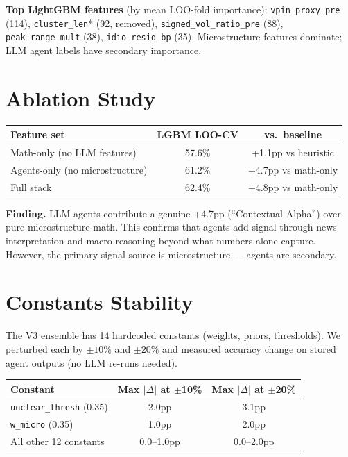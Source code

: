 \documentclass[11pt, a4paper]{article}
\begin{document}
\textbf{Top LightGBM features} (by mean LOO-fold importance): \texttt{vpin\_proxy\_pre} (114), \texttt{cluster\_len}* (92, removed), \texttt{signed\_vol\_ratio\_pre} (88), \texttt{peak\_range\_mult} (38), \texttt{idio\_resid\_bp} (35). Microstructure features dominate; LLM agent labels have secondary importance.

\section{Ablation Study}

\begin{center}
\begin{tabular}{lcc}
\toprule
\textbf{Feature set} & \textbf{LGBM LOO-CV} & \textbf{vs.\ baseline} \\
\midrule
Math-only (no LLM features) & 57.6\% & +1.1pp vs heuristic \\
Agents-only (no microstructure) & 61.2\% & +4.7pp vs math-only \\
Full stack & 62.4\% & +4.8pp vs math-only \\
\bottomrule
\end{tabular}
\end{center}

\textbf{Finding.} LLM agents contribute a genuine +4.7pp (``Contextual Alpha'') over pure microstructure math. This confirms that agents add signal through news interpretation and macro reasoning beyond what numbers alone capture. However, the primary signal source is microstructure — agents are secondary.

\section{Constants Stability}

The V3 ensemble has 14 hardcoded constants (weights, priors, thresholds). We perturbed each by $\pm10\%$ and $\pm20\%$ and measured accuracy change on stored agent outputs (no LLM re-runs needed).

\begin{center}
\begin{tabular}{lcc}
\toprule
\textbf{Constant} & \textbf{Max $|\Delta|$ at $\pm$10\%} & \textbf{Max $|\Delta|$ at $\pm$20\%} \\
\midrule
\texttt{unclear\_thresh} (0.35) & 2.0pp & 3.1pp \\
\texttt{w\_micro} (0.35) & 1.0pp & 2.0pp \\
All other 12 constants & 0.0--1.0pp & 0.0--2.0pp \\
\bottomrule
\end{tabular}
\end{center}
\end{document}
